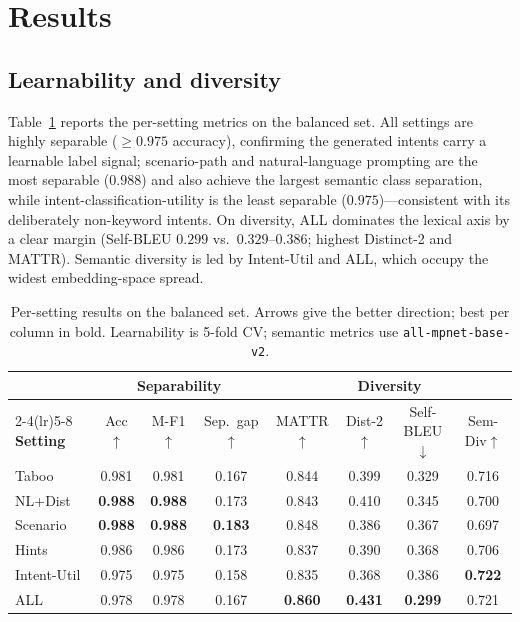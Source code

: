 \documentclass[conference]{IEEEtran}
\begin{document}
\section{Results}
\label{sec:results}

\subsection{Learnability and diversity}
Table~\ref{tab:main} reports the per-setting metrics on the balanced set. All settings are highly separable ($\geq 0.975$ accuracy), confirming the generated intents carry a learnable label signal; scenario-path and natural-language prompting are the most separable ($0.988$) and also achieve the largest semantic class separation, while intent-classification-utility is the least separable ($0.975$)---consistent with its deliberately non-keyword intents. On diversity, ALL dominates the lexical axis by a clear margin (Self-BLEU $0.299$ vs.\ $0.329$--$0.386$; highest Distinct-2 and MATTR). Semantic diversity is led by Intent-Util and ALL, which occupy the widest embedding-space spread.

\begin{table}[t]
\centering
\small
\caption{Per-setting results on the balanced set. Arrows give the better direction; best per column in bold. Learnability is 5-fold CV; semantic metrics use \texttt{all-mpnet-base-v2}.}
\label{tab:main}
\begin{tabular}{l ccc cccc}
\toprule
 & \multicolumn{3}{c}{\textbf{Separability}} & \multicolumn{4}{c}{\textbf{Diversity}} \\
\cmidrule(lr){2-4}\cmidrule(lr){5-8}
\textbf{Setting} & Acc$\uparrow$ & M-F1$\uparrow$ & Sep.\ gap$\uparrow$ & MATTR$\uparrow$ & Dist-2$\uparrow$ & Self-BLEU$\downarrow$ & Sem-Div$\uparrow$ \\
\midrule
Taboo        & 0.981 & 0.981 & 0.167 & 0.844 & 0.399 & 0.329 & 0.716 \\
NL+Dist      & \textbf{0.988} & \textbf{0.988} & 0.173 & 0.843 & 0.410 & 0.345 & 0.700 \\
Scenario     & \textbf{0.988} & \textbf{0.988} & \textbf{0.183} & 0.848 & 0.386 & 0.367 & 0.697 \\
Hints        & 0.986 & 0.986 & 0.173 & 0.837 & 0.390 & 0.368 & 0.706 \\
Intent-Util  & 0.975 & 0.975 & 0.158 & 0.835 & 0.368 & 0.386 & \textbf{0.722} \\
ALL          & 0.978 & 0.978 & 0.167 & \textbf{0.860} & \textbf{0.431} & \textbf{0.299} & 0.721 \\
\bottomrule
\end{tabular}
\end{table}
\end{document}

